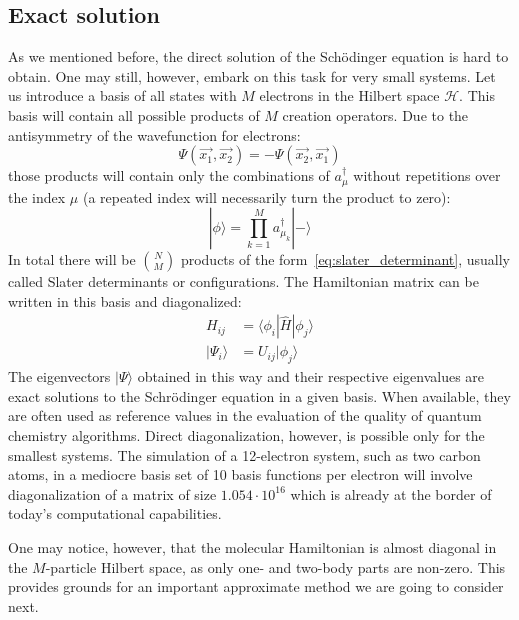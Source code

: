 \subsection{Exact solution}
As we mentioned before, the direct solution of the Sch{\"o}dinger equation is 
hard to obtain. One may still, however, embark on this task for very small 
systems. Let us introduce a basis of all states with $M$ electrons in the 
Hilbert space $\mathcal{H}$. This basis will contain all possible products of 
$M$ creation operators. Due to the antisymmetry of the 
wavefunction for electrons:
%
\begin{equation}
  \Psi(\vec{x_{1}}, \vec{x_{2}}) = - \Psi(\vec{x_{2}}, \vec{x_{1}}) 
\end{equation}
%
those products will contain only the combinations of $a^{\dagger}_{\mu}$ 
without repetitions over the index $\mu$ (a repeated index will necessarily 
turn the product to zero):
%
\begin{equation}
 | \phi \rangle = \prod_{k=1}^{M} a^{\dagger}_{\mu_{k}} |- \rangle  
 \label{eq:slater_determinant}
\end{equation}
%
In total there will be $N \choose M$ products of the
form~\ref{eq:slater_determinant}, usually called Slater determinants or 
configurations. The Hamiltonian matrix can be written in this basis and 
diagonalized:
%
\begin{equation}
\begin{aligned}
 H_{ij} &= \langle \phi_{i} | \hat{H} | \phi_{j} \rangle \\
 | \Psi_{i} \rangle &= U_{ij} |\phi_{j} \rangle
\end{aligned}
\end{equation}
%
The eigenvectors $| \Psi \rangle$ obtained in this way and their respective 
eigenvalues are exact solutions to the Schr{\"o}dinger equation in a given 
basis. When available, they are often used as reference values in the
evaluation of the quality of quantum chemistry algorithms. Direct 
diagonalization, however, is possible only for the smallest systems. The 
simulation of a 12-electron system, such as two carbon atoms, in a mediocre 
basis set of 10 basis functions per electron will involve diagonalization of 
a matrix of size $1.054 \cdot 10^{16}$ which is already at the border of 
today's computational capabilities.

One may notice, however, that the molecular Hamiltonian is almost diagonal in 
the $M$-particle Hilbert space, as only one- and two-body parts are non-zero. 
This provides grounds for an important approximate method we are going to 
consider next. 

